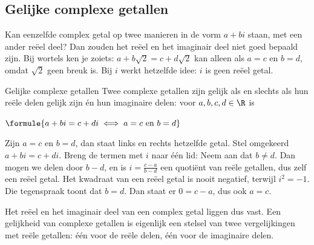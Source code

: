 \begin{oefeningen}
\end{oefeningen}

\subsection{Gelijke complexe getallen}

Kan eenzelfde complex getal op twee manieren in de vorm $a + bi$ staan, met een ander reëel deel? Dan zouden het reëel en het imaginair deel niet goed bepaald zijn. Bij wortels ken je zoiets: $a + b\sqrt2 = c + d\sqrt2$ kan alleen als $a = c$ en $b = d$, omdat $\sqrt2$ geen breuk is. Bij $i$ werkt hetzelfde idee: $i$ is geen reëel getal.

\begin{theorie}
\begin{stelling}{Gelijke complexe getallen}
Twee complexe getallen zijn gelijk als en slechts als hun reële delen gelijk zijn én hun imaginaire delen: voor $a, b, c, d \in \R$ is

\vspace{1mm}
\qquad $\formule{a + bi = c + di \iff a = c \text{ en } b = d}$
\end{stelling}

\begin{bewijs}
Zijn $a = c$ en $b = d$, dan staat links en rechts hetzelfde getal. Stel omgekeerd $a + bi = c + di$. Breng de termen met $i$ naar één lid:
Neem aan dat $b \neq d$. Dan mogen we delen door $b - d$, en is $i = \frac{c - a}{b - d}$ een quotiënt van reële getallen, dus zelf een reëel getal. Het kwadraat van een reëel getal is nooit negatief, terwijl $i^2 = -1$. Die tegenspraak toont dat $b = d$. Dan staat er $0 = c - a$, dus ook $a = c$.
\end{bewijs}
\end{theorie}

Het reëel en het imaginair deel van een complex getal liggen dus vast. Een gelijkheid van complexe getallen is eigenlijk een stelsel van twee vergelijkingen met reële getallen: één voor de reële delen, één voor de imaginaire delen.


